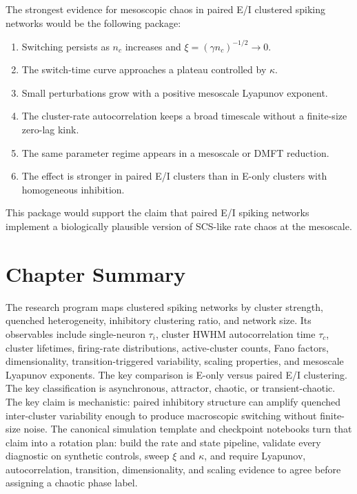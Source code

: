 The strongest evidence for mesoscopic chaos in paired E/I clustered spiking
networks would be the following package:
\begin{enumerate}
    \item Switching persists as \(n_c\) increases and
    \(\xi=(\gamma n_c)^{-1/2}\to 0\).
    \item The switch-time curve approaches a plateau controlled by \(\kappa\).
    \item Small perturbations grow with a positive mesoscale Lyapunov exponent.
    \item The cluster-rate autocorrelation keeps a broad timescale without a
    finite-size zero-lag kink.
    \item The same parameter regime appears in a mesoscale or DMFT reduction.
    \item The effect is stronger in paired E/I clusters than in E-only clusters
    with homogeneous inhibition.
\end{enumerate}
This package would support the claim that paired E/I spiking networks implement
a biologically plausible version of SCS-like rate chaos at the mesoscale.

\section{Chapter Summary}
\label{sec:ch10-summary}

The research program maps clustered spiking networks by cluster strength,
quenched heterogeneity, inhibitory clustering ratio, and network size. Its
observables include single-neuron \(\tau_i\), cluster HWHM autocorrelation
time \(\tau_c\), cluster lifetimes, firing-rate distributions,
active-cluster counts, Fano factors, dimensionality, transition-triggered
variability, scaling properties, and mesoscale Lyapunov exponents. The key
comparison is E-only versus paired E/I clustering. The key classification is
asynchronous, attractor, chaotic, or transient-chaotic. The key claim is
mechanistic: paired inhibitory structure can amplify quenched inter-cluster
variability enough to produce macroscopic switching without finite-size noise.
The canonical simulation template and checkpoint notebooks turn that claim into
a rotation plan: build the rate and state pipeline, validate every diagnostic
on synthetic controls, sweep \(\xi\) and \(\kappa\), and require Lyapunov,
autocorrelation, transition, dimensionality, and scaling evidence to agree
before assigning a chaotic phase label.

